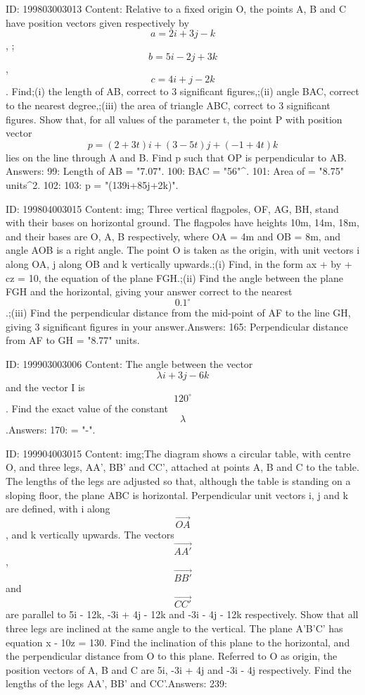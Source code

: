\documentclass{article}
\begin{document}
ID: 199803003013
Content:
Relative to a fixed origin O, the points A, B and C have position vectors given respectively by $$a = 2i + 3j - k$$, ;$$b = 5i - 2j + 3k$$, $$c = 4i + j - 2k$$. Find;(i) the length of AB, correct to 3 significant figures,;(ii) angle BAC, correct to the nearest degree,;(iii) the area of triangle ABC, correct to 3 significant figures. Show that, for all values of the parameter t, the point P with position vector $$p = (2 + 3t)i + (3 - 5t)j + (-1 + 4t)k$$ lies on the line through A and B. Find p such that OP is perpendicular to AB. Answers:
99: Length of AB = "7.07".
100: \angle BAC = "56"^{\circ}.
101: Area of \DeltaABC = "8.75" units^{2}.
102: 
103: p = "(139i+85j+2k)".

ID: 199804003015
Content:
img; Three vertical flagpoles, OF, AG, BH, stand with their bases on horizontal ground. The flagpoles have heights 10m, 14m, 18m, and their bases are O, A, B respectively, where OA = 4m and OB = 8m, and angle AOB is a right angle. The point O is taken as the origin, with unit vectors i along OA, j along OB and k vertically upwards.;(i) Find, in the form ax + by + cz = 10, the equation of the plane FGH.;(ii) Find the angle between the plane FGH and the horizontal, giving your answer correct to the nearest \[0.1^{\circ}\].;(iii) Find the perpendicular distance from the mid-point of AF to the line GH, giving 3 significant figures in your answer.Answers:
165: Perpendicular distance from AF to GH = "8.77" units.

ID: 199903003006
Content:
The angle between the vector \[\lambda i + 3j - 6k\] and the vector I is \[120^{\circ}\]. Find the exact value of the constant \[\lambda\].Answers:
170: \lambda = "-".

ID: 199904003015
Content:
img;The diagram shows a circular table, with centre O, and three legs, AA', BB' and CC', attached at points A, B and C to the table. The lengths of the legs are adjusted so that, although the table is standing on a sloping floor, the plane ABC is horizontal. Perpendicular unit vectors i, j and k are defined, with i along \[\overrightarrow{OA}\], and k vertically upwards. The vectors \[\overrightarrow{AA'}\], \[\overrightarrow{BB'}\] and \[\overrightarrow{CC'}\] are parallel to 5i - 12k, -3i + 4j - 12k and -3i - 4j - 12k respectively. Show that all three legs are inclined at the same angle to the vertical. The plane A'B'C' has equation x - 10z = 130. Find the inclination of this plane to the horizontal, and the perpendicular distance from O to this plane. Referred to O as origin, the position vectors of A, B and C are 5i, -3i + 4j and -3i - 4j respectively. Find the lengths of the legs AA', BB' and CC'.Answers:
239: 
\end{document}
